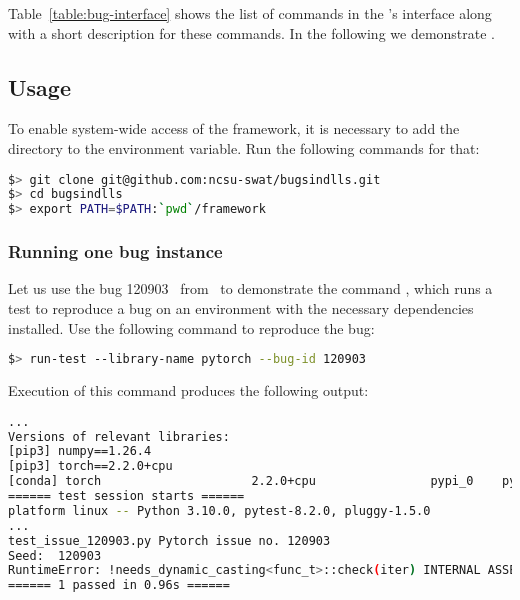 \documentclass[sigconf,screen]{acmart}
\begin{document}
Table~\ref{table:bug-interface} shows the list of commands in the
\tname's interface along with a short description for these
commands. In the following we demonstrate \tname.

\subsection{Usage}
\label{sec:usage}

To enable system-wide access of the framework, it is necessary to add
the directory  to the  environment
variable. Run the following commands for that:

\begin{lstlisting}[language=bash,basicstyle=\small,]
$> git clone git@github.com:ncsu-swat/bugsindlls.git
$> cd bugsindlls
$> export PATH=$PATH:`pwd`/framework
\end{lstlisting}


\subsubsection{Running one bug instance}



Let us use the bug 120903~\cite{torch120903} from \torch\ to demonstrate the
command , which runs a test to reproduce a bug on an
environment with the necessary dependencies installed. Use the
following command to reproduce the bug:

\begin{lstlisting}[language=bash,basicstyle=\small,]
$> run-test --library-name pytorch --bug-id 120903
\end{lstlisting}

\noindent
Execution of this command produces the following output:

\begin{lstlisting}[language=bash,basicstyle=\small,]
... 
Versions of relevant libraries:
[pip3] numpy==1.26.4
[pip3] torch==2.2.0+cpu
[conda] torch                     2.2.0+cpu                pypi_0    pypi
====== test session starts ======
platform linux -- Python 3.10.0, pytest-8.2.0, pluggy-1.5.0
...
test_issue_120903.py Pytorch issue no. 120903
Seed:  120903
RuntimeError: !needs_dynamic_casting<func_t>::check(iter) INTERNAL ASSERT FAILED at "../aten/src/ATen/native/cpu/Loops.h":310, please report a bug to PyTorch. 
====== 1 passed in 0.96s ======
\end{lstlisting}
\end{document}
